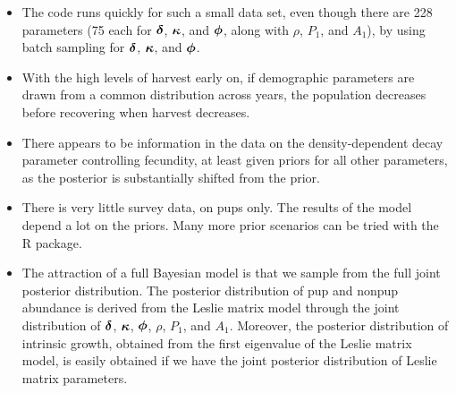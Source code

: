 \documentclass[mathserif,compress]{beamer}
\def\bdelta{\mbox{\boldmath $\delta$}}
\def\bphi{\mbox{\boldmath $\phi$}}
\def\bkappa{\mbox{\boldmath $\kappa$}}
\begin{document}
\begin{frame}

\begin{itemize}
 
  \item The code runs quickly for such a small data set, even though there are 228 parameters (75 each for $\bdelta$, $\bkappa$, and $\bphi$, along with $\rho$, $P_{1}$, and $A_{1}$), by using batch sampling for $\bdelta$, $\bkappa$, and $\bphi$.

  \item With the high levels of harvest early on, if demographic parameters are drawn from a common distribution across years, the population decreases before recovering when harvest decreases.
  
  \item There appears to be information in the data on the density-dependent decay parameter controlling fecundity, at least given priors for all other parameters, as the posterior is substantially shifted from the prior.

\end{itemize}

\end{frame}


\begin{frame}

\begin{itemize}
 
  \item There is very little survey data, on pups only.  The results of the model depend a lot on the priors.  Many more prior scenarios can be tried with the R package.

  \item The attraction of a full Bayesian model is that we sample from the full joint posterior distribution.  The posterior distribution of pup and nonpup abundance is derived from the Leslie matrix model through the joint distribution of $\bdelta$, $\bkappa$, $\bphi$, $\rho$, $P_{1}$, and $A_{1}$.  Moreover, the posterior distribution of intrinsic growth, obtained from the first eigenvalue of the Leslie matrix model, is easily obtained if we have the joint posterior distribution of Leslie matrix parameters.
 
\end{itemize}

\end{frame}
\end{document}
